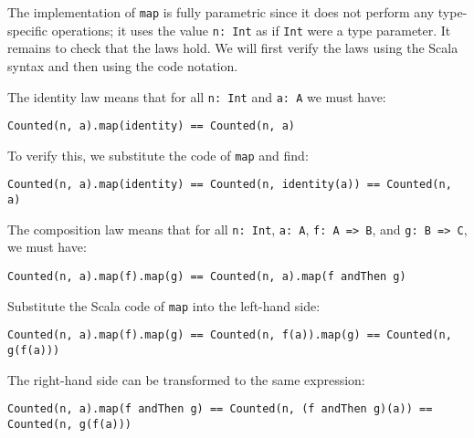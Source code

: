 The implementation of \lstinline!map! is fully parametric since it
does not perform any type-specific operations; it uses the value \lstinline!n: Int!
as if \lstinline!Int! were a type parameter. It remains to check
that the laws hold. We will first verify the laws using the Scala
syntax and then using the code notation.

The identity law means that for all \lstinline!n: Int! and \lstinline!a: A!
we must have:
\begin{lstlisting}
Counted(n, a).map(identity) == Counted(n, a)
\end{lstlisting}
To verify this, we substitute the code of \lstinline!map! and find:
\begin{lstlisting}
Counted(n, a).map(identity) == Counted(n, identity(a)) == Counted(n, a)
\end{lstlisting}

The composition law means that for all \lstinline!n: Int!, \lstinline!a: A!,
\lstinline!f: A => B!, and \lstinline!g: B => C!, we must have:
\begin{lstlisting}
Counted(n, a).map(f).map(g) == Counted(n, a).map(f andThen g)
\end{lstlisting}
Substitute the Scala code of \lstinline!map! into the left-hand side:
\begin{lstlisting}
Counted(n, a).map(f).map(g) == Counted(n, f(a)).map(g) == Counted(n, g(f(a)))
\end{lstlisting}
The right-hand side can be transformed to the same expression:
\begin{lstlisting}
Counted(n, a).map(f andThen g) == Counted(n, (f andThen g)(a)) == Counted(n, g(f(a)))
\end{lstlisting}

